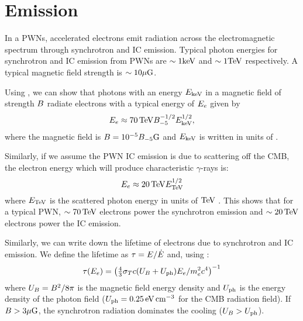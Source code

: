 \section{ Emission}

In a \acp{PWN}, accelerated electrons emit radiation across the
electromagnetic spectrum through synchrotron and \ac{IC} emission.
Typical photon energies for synchrotron and \ac{IC} emission from
\acp{PWN} are $\sim1\text{keV}$ and $\sim1\text{TeV}$ respectively.  A
typical magnetic field strength is $\sim10\mu\text{G}$.

Using , we can show that
photons with an energy $E_\text{keV}$ in a magnetic field of strength
$B$ radiate electrons with a typical energy of
$E_e$ given by
\begin{equation}
  E_e \approx  70\,\text{TeV} B_{-5}^{-1/2} E_\text{keV}^{1/2},
\end{equation}
where the magnetic field is $B=10^{-5}
B_{-5}\text{G}$ and $E_\text{keV}$ is written in units of \kev
\citep{de-jager_2009a_implications-observations}.

Similarly, if we assume the \ac{PWN} \ac{IC} emission is due to scattering
off the \ac{CMB}, the electron energy which will produce characteristic
\tev $\gamma$-rays is:
\begin{equation}
  E_e \approx 20\,\text{TeV} E_\text{TeV}^{1/2}
\end{equation}
where $E_\text{TeV}$ is the scattered photon energy in units of $\text{TeV}$
\citep{de-jager_2009a_implications-observations}.  This shows that for a
typical \ac{PWN}, $\sim70\,\text{TeV}$ electrons power the synchrotron
emission and $\sim20\,\text{TeV}$ electrons power the \ac{IC} emission.

Similarly, we can write down the lifetime of electrons due to
synchrotron and \ac{IC} emission. We define the lifetime as $\tau =
E/\dot{E}$ and, using \cite{rybicki_1979a_radiative-processes}:
\begin{equation}
  \tau(E_e) = 
  \left(
  \tfrac{4}{3} \sigma_T c (U_B + U_\text{ph}) 
  E_e/ m_e^2c^4
  \right)^{-1}
\end{equation}
where $U_B = B^2/8\pi$
is the magnetic field energy density and
$U_\text{ph}$ is the energy density of the photon field
($U_\text{ph}=0.25\,\text{eV}\,\text{cm}^{-3}$
for the \ac{CMB} radiation field).  If $B>3\mu\text{G}$, the synchrotron
radiation dominates the cooling ($U_B >
U_\text{ph}$).

